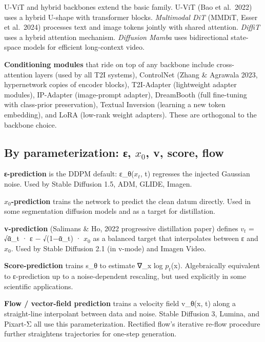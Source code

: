 \documentclass{article}
\begin{document}
U-ViT and hybrid backbones extend the basic family. U-ViT (Bao et al.~2022) uses a hybrid U-shape with transformer blocks. \emph{Multimodal DiT} (MMDiT, Esser et al.~2024) processes text and image tokens jointly with shared attention. \emph{DiffiT} \citep{hatamizadeh20242024} uses a hybrid attention mechanism. \emph{Diffusion Mamba} \citep{mo2024scalingdiffusionma} uses bidirectional state-space models for efficient long-context video.

\textbf{Conditioning modules} that ride on top of any backbone include cross-attention layers (used by all T2I systems), ControlNet (Zhang \& Agrawala 2023, hypernetwork copies of encoder blocks), T2I-Adapter (lightweight adapter modules), IP-Adapter (image-prompt adapter), DreamBooth (full fine-tuning with class-prior preservation), Textual Inversion (learning a new token embedding), and LoRA (low-rank weight adapters). These are orthogonal to the backbone choice.

\subsection{\texorpdfstring{By parameterization: ε, \(x_0\), v, score, flow}{By parameterization: ε, x\_0, v, score, flow}}\label{by-parameterization-ux3b5-x_0-v-score-flow}

\textbf{ε-prediction} is the DDPM default: ε\_θ(\(x_t\), t) regresses the injected Gaussian noise. Used by Stable Diffusion 1.5, ADM, GLIDE, Imagen.

\textbf{\(x_0\)-prediction} trains the network to predict the clean datum directly. Used in some segmentation diffusion models and as a target for distillation.

\textbf{v-prediction} (Salimans \& Ho, 2022 progressive distillation paper) defines \(v_t\) = √ᾱ\_t · ε − √(1−ᾱ\_t) · \(x_0\) as a balanced target that interpolates between ε and \(x_0\). Used by Stable Diffusion 2.1 (in v-mode) and Imagen Video.

\textbf{Score-prediction} trains s\_θ to estimate ∇\_x log \(p_t\)(x). Algebraically equivalent to ε-prediction up to a noise-dependent rescaling, but used explicitly in some scientific applications.

\textbf{Flow / vector-field prediction} \citep{lipman2023flowmatchingforgen} trains a velocity field v\_θ(x, t) along a straight-line interpolant between data and noise. Stable Diffusion 3, Lumina, and Pixart-Σ all use this parameterization. Rectified flow's iterative re-flow procedure further straightens trajectories for one-step generation.
\end{document}
